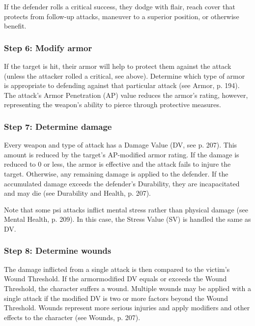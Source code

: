 If the defender rolls a critical success, they dodge with flair, reach cover that protects from follow-up attacks, maneuver to a superior position, or otherwise benefit.

\subsubsection{Step 6: Modify armor} If the target is hit, their armor will help to protect them against the attack (unless the attacker rolled a critical, see above). Determine which type of armor is appropriate to defending against that particular attack (see Armor, p. 194). The attack’s Armor Penetration (AP) value reduces the armor’s rating, however, representing the weapon’s ability to pierce through protective measures.

\subsubsection{Step 7: Determine damage} Every weapon and type of attack has a Damage Value (DV, see p. 207). This amount is reduced by the target’s AP-modified armor rating. If the damage is reduced to 0 or less, the armor is effective and the attack fails to injure the target. Otherwise, any remaining damage is applied to the defender. If the accumulated damage exceeds the defender’s Durability, they are incapacitated and may die (see Durability and Health, p. 207).

Note that some psi attacks inflict mental stress rather than physical damage (see Mental Health, p. 209). In this case, the Stress Value (SV) is handled the same as DV.

\subsubsection{Step 8: Determine wounds} The damage inflicted from a single attack is then compared to the victim’s Wound Threshold. If the armormodified DV equals or exceeds the Wound Threshold, the character suffers a wound. Multiple wounds may be applied with a single attack if the modified DV is two or more factors beyond the Wound Threshold. Wounds represent more serious injuries and apply modifiers and other effects to the character (see Wounds, p. 207).

